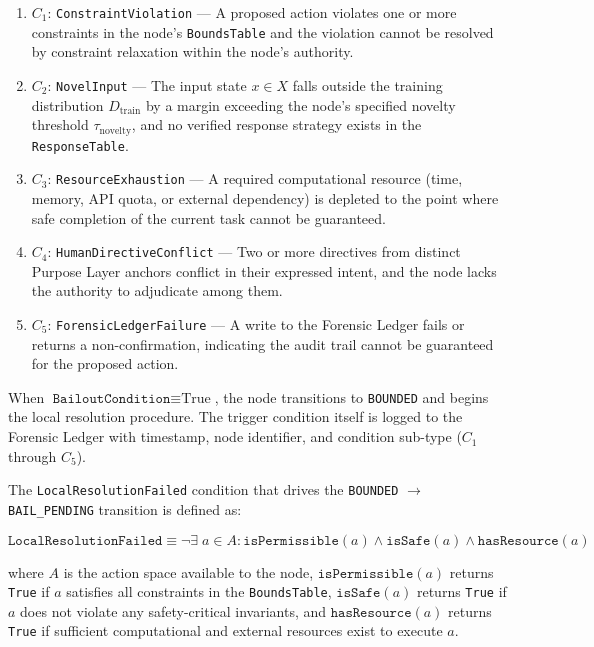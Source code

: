 \begin{enumerate}
    \item $C_1$: \texttt{ConstraintViolation} --- A proposed action violates one or more constraints in the node's \texttt{BoundsTable} and the violation cannot be resolved by constraint relaxation within the node's authority.
    \item $C_2$: \texttt{NovelInput} --- The input state $x \in X$ falls outside the training distribution $D_{\text{train}}$ by a margin exceeding the node's specified novelty threshold $\tau_{\text{novelty}}$, and no verified response strategy exists in the \texttt{ResponseTable}.
    \item $C_3$: \texttt{ResourceExhaustion} --- A required computational resource (time, memory, API quota, or external dependency) is depleted to the point where safe completion of the current task cannot be guaranteed.
    \item $C_4$: \texttt{HumanDirectiveConflict} --- Two or more directives from distinct Purpose Layer anchors conflict in their expressed intent, and the node lacks the authority to adjudicate among them.
    \item $C_5$: \texttt{ForensicLedgerFailure} --- A write to the Forensic Ledger fails or returns a non-confirmation, indicating the audit trail cannot be guaranteed for the proposed action.
\end{enumerate}

When $\texttt{BailoutCondition} \equiv \text{True}$, the node transitions to \texttt{BOUNDED} and begins the local resolution procedure. The trigger condition itself is logged to the Forensic Ledger with timestamp, node identifier, and condition sub-type ($C_1$ through $C_5$).

The \texttt{LocalResolutionFailed} condition that drives the \texttt{BOUNDED} $\rightarrow$ \texttt{BAIL\_PENDING} transition is defined as:

\[
\texttt{LocalResolutionFailed} \equiv \neg \exists \; a \in A : \texttt{isPermissible}(a) \land \texttt{isSafe}(a) \land \texttt{hasResource}(a)
\]

where $A$ is the action space available to the node, $\texttt{isPermissible}(a)$ returns \texttt{True} if $a$ satisfies all constraints in the \texttt{BoundsTable}, $\texttt{isSafe}(a)$ returns \texttt{True} if $a$ does not violate any safety-critical invariants, and $\texttt{hasResource}(a)$ returns \texttt{True} if sufficient computational and external resources exist to execute $a$.

